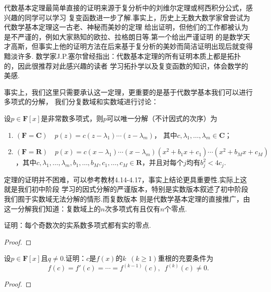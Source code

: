 代数基本定理最简单直接的证明来源于复分析中的刘维尔定理或柯西积分公式，感兴趣的同学可以学习
复变函数进一步了解.事实上，历史上无数大数学家曾尝试为代数学基本定理这一古老、神秘而美妙的定理
给出证明，但他们的工作都被认为是不严谨的，例如大家熟知的欧拉、拉格朗日等.第一个给出严谨证明
的是数学天才高斯，但事实上他的证明方法在后来基于复分析的美妙而简洁证明出现后就变得黯淡许多.
数学家J.P.塞尔曾经指出：代数基本定理的所有证明本质上都是拓扑的，因此很推荐对此感兴趣的读者
学习拓扑学以及复变函数的知识，体会数学的美感.

事实上，我们这里只需要承认这一定理，更重要的是基于代数学基本我们可以进行多项式的分解，
我们分复数域和实数域进行讨论：
\begin{theorem} \label{thm:17:多项式分解}
    设$p\in\mathbf{F}[x]$是非常数多项式，则$p$可以唯一分解（不计因式的次序）为
    \begin{enumerate}
        \item $(\mathbf{F}=\mathbf{C})\quad p(z)=c(z-\lambda_1)\cdots(z-\lambda_m)$，
        其中$c,\lambda_1,\ldots,\lambda_m\in\mathbf{C}$；

        \item $(\mathbf{F}=\mathbf{R})\quad p(x)=c(x-\lambda_1)\cdots(x-\lambda_m)
        (x^2+b_1x+c_1)\cdots(x^2+b_Mx+c_M)$，其中$c,\lambda_1,\ldots,\lambda_m,b_1,\ldots,b_M,
        c_1,\ldots,c_M\in\mathbf{R}$，并且对每个$j$均有$b_j^2<4c_j$.
    \end{enumerate}
\end{theorem}
定理的证明并不困难，可以参考教材4.14-4.17，事实上结论更具重要性.实际上这就是我们初中阶段
学习的因式分解的严谨版本，特别是实数版本叙述了初中阶段我们囿于实数域无法分解的情形.而复数版本
则是代数学基本定理的直接推广，由这一分解我们知道：复数域上的$n$次多项式有且仅有$n$个零点.
\begin{example}
    证明：每个奇数次的实系数多项式都有实的零点.
\end{example}
\begin{proof}
    
\end{proof}

\begin{example}
    设$p\in\mathbf{F}[x]$且$q\neq 0$.证明：$c$是$f(x)$的$k\enspace(k\geqslant 1)$重根的充要条件为
    \[f(c)=f'(c)=\cdots=f^{(k-1)}(c),\enspace f^{(k)}(c)\neq 0.\]
\end{example}
\begin{proof}
    
\end{proof}

